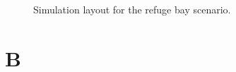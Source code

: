 \begin{appendices}
	\begin{figure}[h]
	\centering
	\caption{Simulation layout for the refuge bay scenario.}
	\label{fig: Refuge bay layout}
\end{figure}	
\chapter{B}
\end{appendices}
